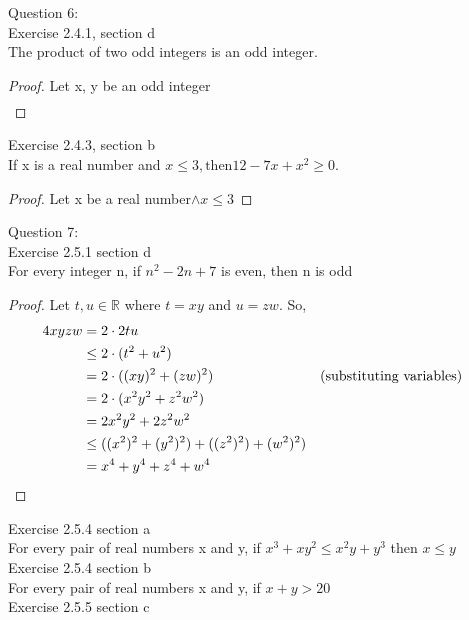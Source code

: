 \documentclass[11pt]{article}
\begin{document}
\noindent Question 6:\\
Exercise 2.4.1, section d\\
The product of two odd integers is an odd integer.
\begin{proof}
	Let x, y be an odd integer
	\begin{align*}
	\end{align*}
\end{proof}

Exercise 2.4.3, section b\\
If x is a real number and $x \leq 3, \text{then} 12 - 7x + x^2 \geq 0$.\\
\begin{proof}
	Let x be a real number$ \wedge x \leq 3$
\end{proof}



\noindent Question 7:\\


Exercise 2.5.1 section d \\

For every integer n, if $n^2 - 2n + 7$ is even, then n is odd\\
\begin{proof}
  Let $t,u \in \mathbb{R}$ where $t=xy$ and $u=zw$. So,
  \begin{align*}
    4xyzw &= 2\cdot2tu \\
    &\le 2\cdot(t^2+u^2) \\
    &= 2\cdot((xy)^2+(zw)^2) &&\text{(substituting variables)} \\
    &= 2\cdot(x^2y^2+z^2w^2) \\ 
    &= 2x^2y^2+2z^2w^2 \\
    &\le ((x^2)^2+(y^2)^2)+((z^2)^2)+(w^2)^2) \\
    &= x^4+y^4+z^4+w^4 &&\qedhere
  \end{align*}
\end{proof}

Exercise 2.5.4 section a\\

For every pair of real numbers x and y, if $x^3 + xy^2 \leq x^2y + y^3$ then $x \leq y$\\

Exercise 2.5.4 section b\\

For every pair of real numbers x and y, if $x + y > 20$\\
  
Exercise 2.5.5 section c\\
\end{document}
